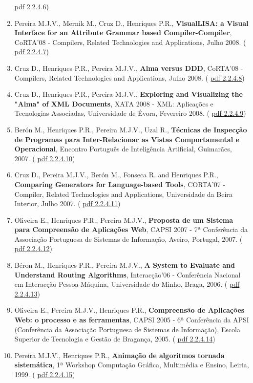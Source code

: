 \documentclass[11pt]{article}
\begin{document}
\begin{enumerate}
{\href{run:Publicacoes/publicacoes/29.pdf}{pdf 2.2.4.6})}
\item{Pereira M.J.V., Mernik M., Cruz D., Henriques P.R., {
\bf{ VisualLISA: a Visual Interface for an Attribute Grammar based Compiler-Compiler}}, CoRTA'08 - Compilers, Related Technologies and Applications, Julho 2008. (
\href{run:Publicacoes/publicacoes/35.pdf}{pdf 2.2.4.7})}
\item{Cruz D., Henriques P.R., Pereira M.J.V., {
\bf{ Alma versus DDD}}, CoRTA'08 - Compilers, Related Technologies and Applications, Julho 2008. (
\href{run:Publicacoes/publicacoes/92.pdf}{pdf 2.2.4.8})}
\item{Cruz D., Henriques P.R., Pereira M.J.V., {
\bf{ Exploring and Visualizing the "Alma" of XML Documents}}, XATA 2008 - XML: Aplicações e Tecnologias Associadas, Universidade de Évora, Fevereiro 2008. (
\href{run:Publicacoes/publicacoes/30.pdf}{pdf 2.2.4.9})}
\item{Berón M., Henriques P.R., Pereira M.J.V., Uzal R., {
\bf{ Técnicas de Inspecção de Programas para Inter-Relacionar as Vistas Comportamental e Operacional}}, Encontro Português de Inteligência Artificial, Guimarães, 2007. (
\href{run:Publicacoes/publicacoes/23.pdf}{pdf 2.2.4.10})}
\item{Cruz D., Pereira M.J.V., Berón M., Fonseca R. and Henriques P.R., {
\bf{ Comparing Generators for Language-based Tools}}, CORTA'07 - Compiler, Related Technologies and Applications, Universidade da Beira Interior, Julho 2007. (
\href{run:Publicacoes/publicacoes/26.pdf}{pdf 2.2.4.11}) }
\item{Oliveira E., Henriques P.R., Pereira M.J.V., {
\bf{ Proposta de um Sistema para Compreensão de Aplicações Web}}, CAPSI 2007 - 7ª Conferência da Associação Portuguesa de Sistemas de Informação, Aveiro, Portugal, 2007. (
\href{run:Publicacoes/publicacoes/16.pdf}{pdf 2.2.4.12})}
\item{Béron M., Henriques P.R., Pereira M.J.V., {
\bf{ A System to Evaluate and Understand Routing Algorithms}}, Interacção'06 - Conferência Nacional em Interacção Pessoa-Máquina, Universidade do Minho, Braga, 2006. (
\href{run:Publicacoes/publicacoes/13.pdf}{pdf 2.2.4.13})}
\item{Oliveira E., Pereira M.J.V., Henriques P.R., {
\bf{ Compreensão de Aplicações Web: o processo e as ferramentas}}, CAPSI 2005 - 6ª Conferência da APSI (Conferência da Associação Portuguesa de Sistemas de Informação), Escola Superior de Tecnologia e Gestão de Bragança, 2005. (
\href{run:Publicacoes/publicacoes/12.pdf}{pdf 2.2.4.14})}
\item{Pereira M.J.V., Henriques P.R., {
\bf{ Animação de algoritmos tornada sistemática}}, 1ª Workshop Computação Gráfica, Multimédia e Ensino, Leiria, 1999. (
\href{run:Publicacoes/publicacoes/3.pdf}{pdf 2.2.4.15})}
\end{enumerate}   
\end{document}
